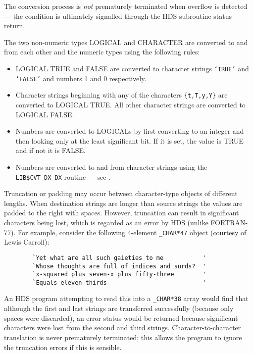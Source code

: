 The conversion process is {\em not} prematurely terminated when overflow is
detected --- the condition is ultimately signalled through the HDS subroutine
status return.

The two non-numeric types LOGICAL and CHARACTER are converted to and from each
other and the numeric types using the following rules:

\begin {itemize}
\item LOGICAL TRUE and FALSE are converted to character strings
{\tt `TRUE'} and {\tt `FALSE'} and numbers 1 and 0 respectively.
\item Character strings beginning with any of the characters {\tt \{t,T,y,Y\}}
are converted to LOGICAL TRUE. All other character strings are converted to
LOGICAL FALSE.
\item Numbers are converted to LOGICALs by first converting to an integer
and then looking only at the least significant bit. If it is set, the value
is TRUE and if not it is FALSE.
\item Numbers are converted to and from character strings using the {\tt
LIB\$CVT\_DX\_DX} routine --- see \cite{run_time_library_reference}.
\end {itemize}

Truncation or padding may occur between character-type objects of different
lengths. When destination strings are longer than source strings the values
are padded to the right with spaces. However, truncation can result in
significant characters being lost, which is regarded as an error by HDS (unlike
FORTRAN-77). For example, consider the following 4-element {\tt \_CHAR*47}
object (courtesy of Lewis Carroll):

\begin {verbatim}
        `Yet what are all such gaieties to me           '
        `Whose thoughts are full of indices and surds?  '
        `x-squared plus seven-x plus fifty-three        '
        `Equals eleven thirds                           '
\end{verbatim}

An HDS program attempting to read this into a {\tt \_CHAR*38} array would find
that although the first and last strings are transferred successfully (because
only spaces were discarded), an error status would be returned because
significant characters were lost from the second and third strings.
Character-to-character translation is never prematurely terminated; this allows
the program to ignore the truncation errors if this is sensible.

